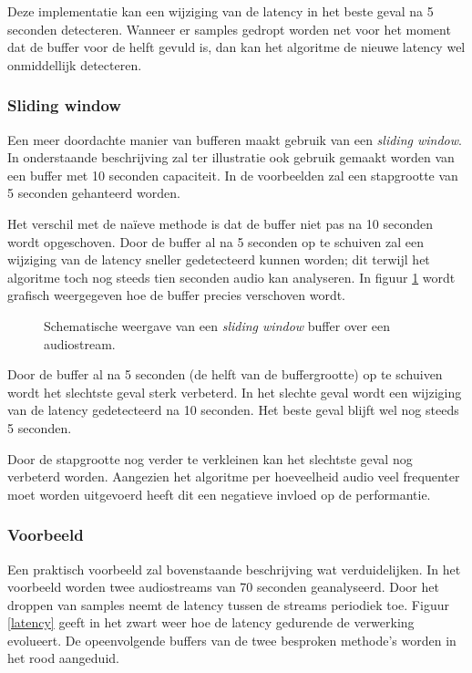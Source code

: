 Deze implementatie kan een wijziging van de latency in het beste geval na 5 seconden detecteren. Wanneer er samples gedropt worden net voor het moment dat de buffer voor de helft gevuld is, dan kan het algoritme de nieuwe latency wel onmiddellijk detecteren.

\subsubsection{Sliding window}

Een meer doordachte manier van bufferen maakt gebruik van een \textit{sliding window}. In onderstaande beschrijving zal ter illustratie ook gebruik gemaakt worden van een buffer met 10 seconden capaciteit. In de voorbeelden zal een stapgrootte van 5 seconden gehanteerd worden. 

Het verschil met de naïeve methode is dat de buffer niet pas na 10 seconden wordt opgeschoven. Door de buffer al na 5 seconden op te schuiven zal een wijziging van de latency sneller gedetecteerd kunnen worden; dit terwijl het algoritme toch nog steeds tien seconden audio kan analyseren. In figuur \ref{slidingwindow} wordt grafisch weergegeven hoe de buffer precies verschoven wordt.

\begin{figure}[h!]
	\captionsetup{width=0.7\textwidth}
	\caption[Schematische weergave van de buffer]{Schematische weergave van een \textit{sliding window} buffer over een audiostream.}
	\begin{center}
		\advance\parskip0.3cm
		
	\end{center}
	\label{slidingwindow}
\end{figure}

Door de buffer al na 5 seconden (de helft van de buffergrootte) op te schuiven wordt het slechtste geval sterk verbeterd. In het slechte geval wordt een wijziging van de latency gedetecteerd na 10 seconden. Het beste geval blijft wel nog steeds 5 seconden.

Door de stapgrootte nog verder te verkleinen kan het slechtste geval nog verbeterd worden. Aangezien het algoritme per hoeveelheid audio veel frequenter moet worden uitgevoerd heeft dit een negatieve invloed op de performantie.

\subsubsection{Voorbeeld}

Een praktisch voorbeeld zal bovenstaande beschrijving wat verduidelijken. In het voorbeeld worden twee audiostreams van 70 seconden geanalyseerd. Door het droppen van samples neemt de latency tussen de streams periodiek toe. Figuur \ref{latency} geeft in het zwart weer hoe de latency gedurende de verwerking evolueert. De opeenvolgende buffers van de twee besproken methode's worden in het rood aangeduid. 

